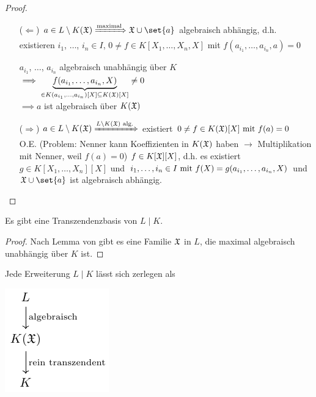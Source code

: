 \begin{proof}\leavevmode\vspace*{\dimexpr-\baselineskip+2\lineskip}
	\begin{itemize}
		\item[($\Leftarrow$)] $a \in L \setminus K(\Halb) \xRightarrow{\text{maximal}} \Halb \cup \set{a}$ algebraisch abhängig, d.h. existieren $i_1$, $\dots$, $i_n \in I$, $0 \neq f \in K[X_1, \dots, X_n, X]$ mit $f(a_{i_1}, \dots, a_{i_n}, a) = 0$
		
		$a_{i_1}$, $\dots$, $a_{i_n}$ algebraisch unabhängig über $K$\\
		$\implies \underbrace{f(a_{i_1}, \dots, a_{i_n}, X)}_{\in K(a_{i_1}, \dots, a_{i_n})[X]\subseteq K(\Halb)[X]}\neq 0$\\
		$\implies a$ ist algebraisch über $K(\Halb)$
		\item[($\Rightarrow$)] $a \in L\setminus K(\Halb) \xRightarrow{L \setminus K(\Halb) \text{ alg.}}$ existiert $0 \neq f \in K(\Halb)[X] \mit f(a) = 0$\\
		O.E. (Problem: Nenner kann Koeffizienten in $K(\Halb)$ haben $\to$ Multiplikation mit Nenner, weil $f(a) =0$) $f \in K[\Halb][X]$, d.h. es existiert $g \in K[X_1, \dots, X_n][X]$ und $i_1,\dots, i_n \in I \mit f(X) = g(a_{i_1},\dots, a_{i_n}, X)$ und $\Halb \cup \set{a}$ ist algebraisch abhängig.
	\end{itemize}
\end{proof}
\begin{proposition}
	Es gibt eine Transzendenzbasis von $L\mid K$.
\end{proposition}
\begin{proof}
	Nach Lemma von  gibt es eine Familie $\Halb$ in $L$, die maximal algebraisch unabhängig über $K$ ist.
\end{proof}
\begin{conclusion}
	Jede Erweiterung $L\mid K$ lässt sich zerlegen als
\begin{center} %
	\includegraphics{./tikz/lemma_1_5_10.pdf}
\end{center}
\end{conclusion}
